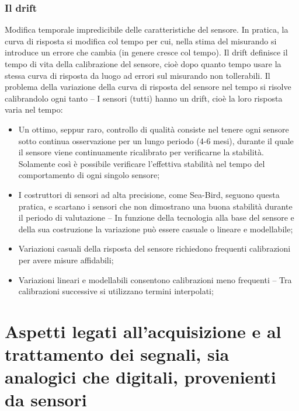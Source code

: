 \documentclass[a4paper,12pt]{article}
\begin{document}
\section{Il drift}
Modifica temporale impredicibile delle caratteristiche del sensore. In pratica, la curva di risposta si modifica col tempo per cui, nella stima del misurando si introduce un errore che cambia (in genere cresce col tempo). Il drift definisce il tempo di vita della calibrazione del sensore, cioè dopo quanto tempo usare la stessa curva di risposta da luogo ad errori sul misurando non tollerabili.
Il problema della variazione della curva di risposta del sensore nel tempo si risolve calibrandolo ogni tanto – I sensori (tutti) hanno un drift, cioè la loro risposta varia nel tempo:
\begin{itemize}
\item Un ottimo, seppur raro, controllo di qualità consiste nel tenere ogni sensore sotto continua osservazione per un lungo periodo (4-6 mesi), durante il quale il sensore viene continuamente ricalibrato per verificarne la stabilità. Solamente così è possibile verificare l’effettiva stabilità nel tempo del comportamento di ogni singolo sensore;
\item I costruttori di sensori ad alta precisione, come Sea-Bird, seguono questa pratica, e scartano i sensori che non dimostrano una buona stabilità durante il periodo di valutazione – In funzione della tecnologia alla base del sensore e della sua costruzione la variazione può essere casuale o lineare e modellabile;
\item Variazioni casuali della risposta del sensore richiedono frequenti calibrazioni per avere misure affidabili;
\item Variazioni lineari e modellabili consentono calibrazioni meno frequenti – Tra calibrazioni successive si utilizzano termini interpolati;
\end{itemize}

\part{Aspetti legati all'acquisizione e al trattamento dei segnali, sia analogici che digitali, provenienti da sensori}

\begin{figure}[p]
\end{figure}
\end{document}

